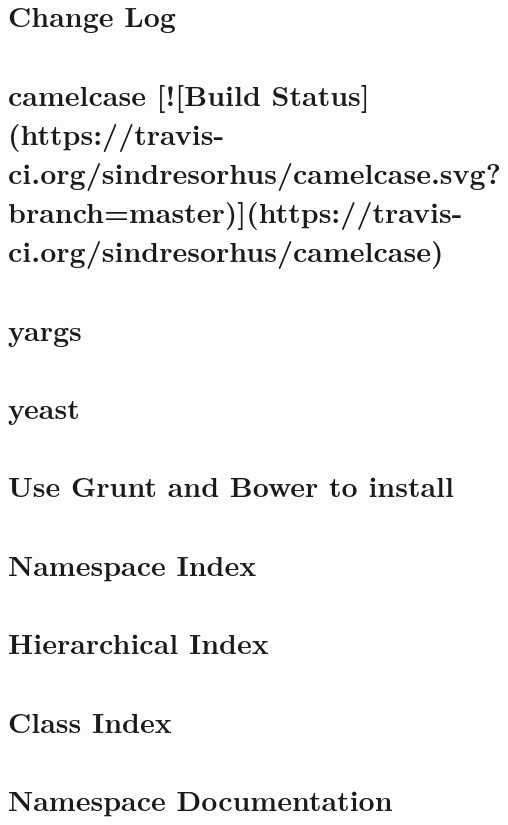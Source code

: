 \documentclass[twoside]{book}
\newcommand{\+}{\discretionary{\mbox{\scriptsize$\hookleftarrow$}}{}{}}
\begin{document}
\chapter{Change Log}
\label{md_app_web_node_modules_yargs__c_h_a_n_g_e_l_o_g}

\chapter{camelcase \mbox{[}!\mbox{[}Build Status\mbox{]}(https\+://travis-\/ci.org/sindresorhus/camelcase.svg?branch=master)\mbox{]}(https\+://travis-\/ci.org/sindresorhus/camelcase)}
\label{md_app_web_node_modules_yargs_node_modules_camelcase_readme}

\chapter{yargs}
\label{md_app_web_node_modules_yargs__r_e_a_d_m_e}

\chapter{yeast}
\label{md_app_web_node_modules_yeast__r_e_a_d_m_e}

\chapter{Use Grunt and Bower to install}
\label{md_app_web__r_e_a_d_m_e}

\chapter{Namespace Index}

\chapter{Hierarchical Index}

\chapter{Class Index}

\chapter{Namespace Documentation}



\end{document}
